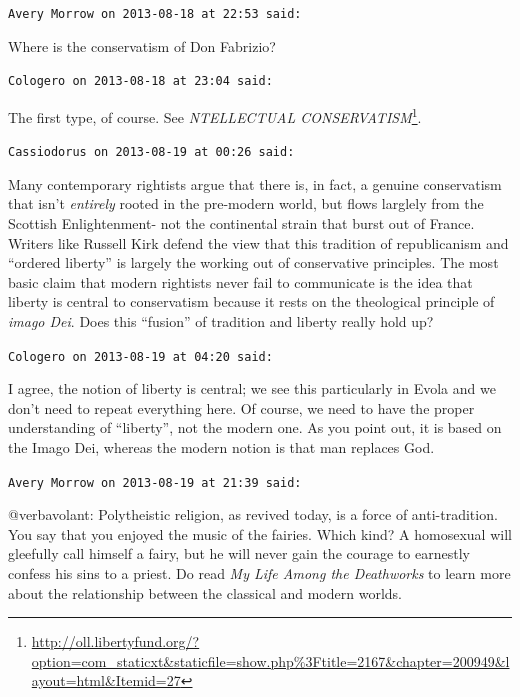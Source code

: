 \begin{footnotesize}
\begin{sffamily}
\texttt{Avery Morrow on 2013-08-18 at 22:53 said:}

Where is the conservatism of Don Fabrizio?

\hfill

\texttt{Cologero on 2013-08-18 at 23:04 said:}

The first type, of course. See \textit{NTELLECTUAL CONSERVATISM}\footnote{\url{http://oll.libertyfund.org/?option=com\_staticxt&staticfile=show.php\%3Ftitle=2167&chapter=200949&layout=html&Itemid=27}}.

\hfill

\texttt{Cassiodorus on 2013-08-19 at 00:26 said:}

Many contemporary rightists argue that there is, in fact, a genuine conservatism that isn't \emph{entirely} rooted in the pre-modern world, but flows larglely from the Scottish Enlightenment- not the continental strain that burst out of France. Writers like Russell Kirk defend the view that this tradition of republicanism and ``ordered liberty'' is largely the working out of conservative principles. The most basic claim that modern rightists never fail to communicate is the idea that liberty is central to conservatism because it rests on the theological principle of \emph{imago Dei}. Does this ``fusion'' of tradition and liberty really hold up?

\hfill

\texttt{Cologero on 2013-08-19 at 04:20 said:}

I agree, the notion of liberty is central; we see this particularly in Evola and we don't need to repeat everything here. Of course, we need to have the proper understanding of ``liberty'', not the modern one. As you point out, it is based on the Imago Dei, whereas the modern notion is that man replaces God.

\hfill

\texttt{Avery Morrow on 2013-08-19 at 21:39 said:}

@verbavolant: Polytheistic religion, as revived today, is a force of anti-tradition. You say that you enjoyed the music of the fairies. Which kind? A homosexual will gleefully call himself a fairy, but he will never gain the courage to earnestly confess his sins to a priest. Do read \emph{My Life Among the Deathworks} to learn more about the relationship between the classical and modern worlds.

\hfill


\end{sffamily}
\end{footnotesize}
